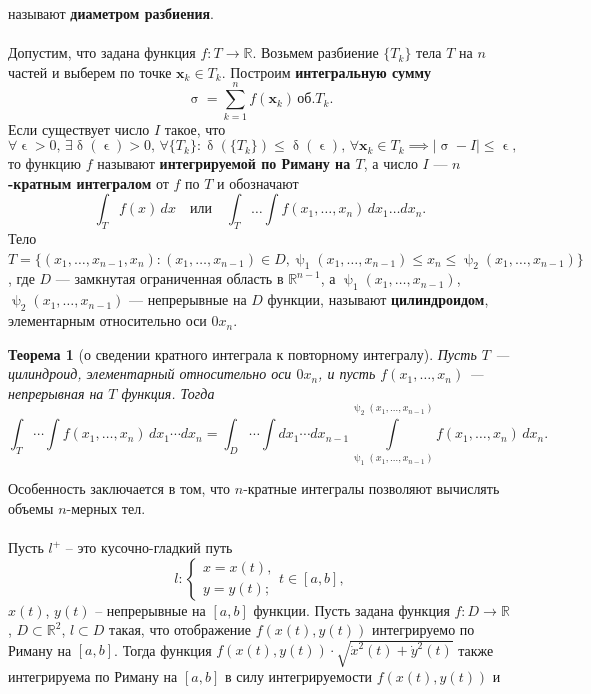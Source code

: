 \documentclass[a4paper, 12pt]{report}
\numberwithin{equation}{section}
\renewcommand{\leq}{\leqslant}
\renewcommand{\delta}{\updelta}
\renewcommand{\sigma}{\upsigma}
\renewcommand{\psi}{\uppsi}
\renewcommand{\varepsilon}{\upvarepsilon}
\newtheorem*{theorem}{Теорема}
\begin{document}
	называют \textbf{диаметром разбиения}.
	\\\\
	Допустим, что задана функция $f : T \to \mathbb{R}$. Возьмем разбиение $\{T_k\}$ тела $T$ на $n$ частей и выберем по точке $\mathbf{x}_k \in T_k$. Построим \textbf{интегральную сумму}
	\[
	\sigma = \sum_{k=1}^n f(\mathbf{x}_k) \, \text{об.} T_k.
	\]
	Если существует число $I$ такое, что
	\[
	\forall \varepsilon > 0, \, \exists \delta(\varepsilon) > 0, \, \forall \{T_k\} : \delta(\{T_k\}) \leq \delta(\varepsilon), \, \forall \mathbf{x}_k \in T_k \implies |\sigma - I| \leq \varepsilon,
	\]
	то функцию $f$ называют \textbf{интегрируемой по Риману на $T$}, а число $I$ — \textbf{$n$-кратным интегралом} от $f$ по $T$ и обозначают
	\[
	\int_T f(x) \, dx \quad \text{или} \quad \int_T \ldots \int f(x_1, \ldots, x_n) \, dx_1 \ldots dx_n.
	\]
	Тело $T = \{(x_1, \ldots, x_{n-1}, x_n) : (x_1, \ldots, x_{n-1}) \in D, \psi_1(x_1, \ldots, x_{n-1}) \leq x_n \leq \psi_2(x_1, \ldots, x_{n-1})\}$,  
	где $D$ — замкнутая ограниченная область в $\mathbb{R}^{n-1}$,  
	а $\psi_1(x_1, \ldots, x_{n-1})$, $\psi_2(x_1, \ldots, x_{n-1})$ — непрерывные на $D$ функции, называют \textbf{цилиндроидом}, элементарным относительно оси $0x_n$.
	\begin{theorem}
		[о сведении кратного интеграла к повторному интегралу]
		Пусть $T$ — цилиндроид, элементарный относительно оси $0x_n$, и пусть $f(x_1, \ldots, x_n)$ — непрерывная на $T$ функция. Тогда
		\[
		\int_T \cdots \int f(x_1, \ldots, x_n) \, dx_1 \cdots dx_n =
		\int_D \cdots \int dx_1 \cdots dx_{n-1} \int\limits_{\psi_1(x_1, \ldots, x_{n-1})}^{\psi_2(x_1, \ldots, x_{n-1})} f(x_1, \ldots, x_n) \, dx_n.
		\]
	\end{theorem}
	\noindent
	Особенность заключается в том, что $n$-кратные интегралы позволяют вычислять объемы $n$-мерных тел.
	\\\\
	Пусть $l^+$ -- это кусочно-гладкий путь
	\begin{equation*}
		l: \begin{cases}
			x = x(t),\\
			y = y(t);
		\end{cases} t \in [a,b],
	\end{equation*}
	$x(t)$, $y(t)$ -- непрерывные на $[a,b]$ функции. 
	Пусть задана функция $f: D \to \mathbb R$, $D \subset \mathbb R^2$, $l\subset D$ такая, что отображение $f(x(t), y(t))$ интегрируемо по Риману на $[a,b]$. Тогда функция $f(x(t), y(t))\cdot \sqrt{\dot x^2 (t) + \dot y^2 (t)}$ также интегрируема по Риману на $[a,b]$ в силу интегрируемости $f(x(t), y(t))$ и 
\end{document}
